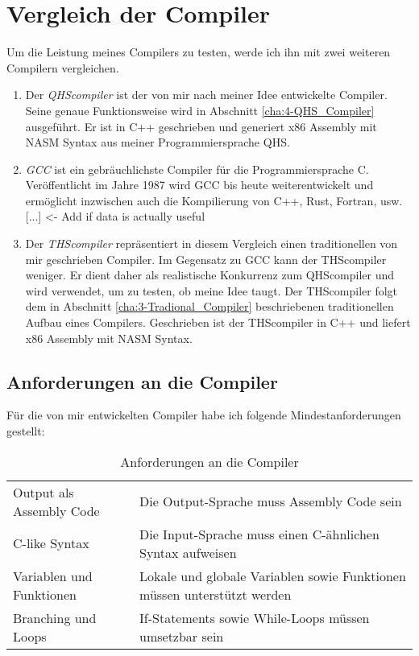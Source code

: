 \chapter{Vergleich der Compiler} \label{cha:2-Vergleich}
Um die Leistung meines Compilers zu testen, werde ich ihn mit zwei weiteren Compilern vergleichen.

\begin{enumerate}
\item
Der \textit{QHScompiler} ist der von mir nach meiner Idee entwickelte Compiler. Seine genaue Funktionsweise wird in Abschnitt \ref{cha:4-QHS_Compiler} ausgeführt.
Er ist in C++ geschrieben und generiert x86 Assembly mit NASM Syntax aus meiner Programmiersprache QHS.

\item
\textit{GCC} ist ein gebräuchlichste Compiler für die Programmiersprache C. Veröffentlicht im Jahre 1987 wird GCC bis heute weiterentwickelt und ermöglicht inzwischen auch die Kompilierung von C++, Rust, Fortran, usw.
[...] <- Add if data is actually useful

\item
Der \textit{THScompiler} repräsentiert in diesem Vergleich einen traditionellen von mir geschrieben Compiler. Im Gegensatz zu GCC kann der THScompiler weniger.
Er dient daher als realistische Konkurrenz zum QHScompiler und wird verwendet, um zu testen, ob meine Idee taugt. Der THScompiler folgt dem in Abschnitt \ref{cha:3-Tradional_Compiler} beschriebenen traditionellen Aufbau eines Compilers.
Geschrieben ist der THScompiler in C++ und liefert x86 Assembly mit NASM Syntax.
\end{enumerate}

\section{Anforderungen an die Compiler}
Für die von mir entwickelten Compiler habe ich folgende Mindestanforderungen gestellt:

\begin{table}[H]
    \centering
    \caption{Anforderungen an die Compiler}
    \vspace{3mm} %
    
    \begin{tabular}{l|l}
    Output als Assembly Code        & Die Output-Sprache muss Assembly Code sein                               \\
    C-like Syntax                   & Die Input-Sprache muss einen C-ähnlichen Syntax aufweisen                \\
    Variablen und Funktionen        & Lokale und globale Variablen sowie Funktionen müssen unterstützt werden  \\
    Branching und Loops             & If-Statements sowie While-Loops müssen umsetzbar sein
    \end{tabular}
\end{table}


